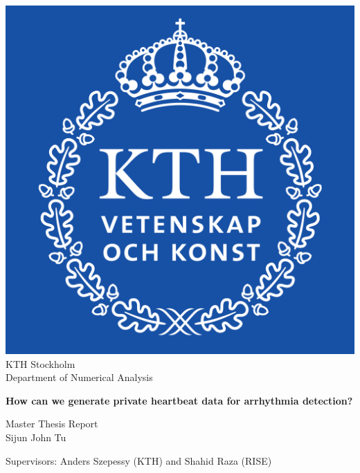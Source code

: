 \begin{titlepage}
	\begin{center}
		\vspace*{1cm}
		\includegraphics[scale=0.1]{pictures/KTH_Royal_Institute_of_Technology_logo.svg.png}\\
		\Large
		KTH Stockholm\\
		Department of Numerical Analysis
		\vspace*{1cm}



		\Huge
		\textbf{How can we generate private heartbeat data for arrhythmia detection?
		}
		
		\vspace{0.5cm}
		
		\vspace{1.5cm}
		
		
		\vfill
		
		Master Thesis Report \\
		Sijun John Tu
		\vspace{0.8cm}

		
		\large
		Supervisors: Anders Szepessy (KTH) and Shahid Raza (RISE)\\
		
	\end{center}
\end{titlepage}